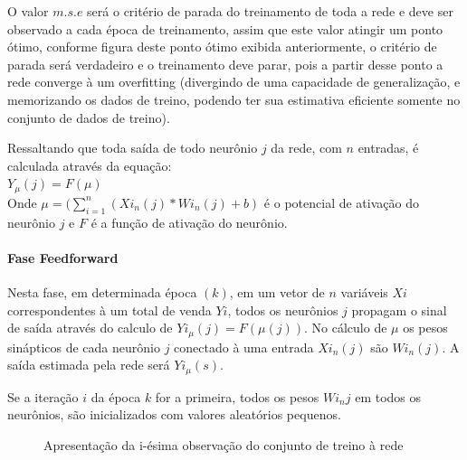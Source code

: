 \documentclass[	12pt, Times, openright, twoside, a4paper, english, brazil]{abntex2}
\begin{document}
            O valor $m.s.e$ será o critério de parada do treinamento de toda a rede e deve ser observado a cada época de treinamento, assim que este valor atingir um ponto ótimo, conforme figura deste ponto ótimo exibida anteriormente, o critério de parada será verdadeiro e o treinamento deve parar, pois a partir desse ponto a rede converge à um overfitting (divergindo de uma capacidade de generalização, e memorizando os dados de treino, podendo ter sua estimativa eficiente somente no conjunto de dados de treino).
            
            Ressaltando que toda saída de todo neurônio $j$ da rede, com $n$ entradas, é calculada através da equação:\\
            $ Y_{\mu}(j) = F(\mu)$\\
            Onde $\mu = (\sum_{i=1}^{n} (Xi_{n}(j)*Wi_{n}(j) + b)$ é o potencial de ativação do neurônio $j$ e $F$ é a função de ativação do neurônio.
            
           \paragraph*{Fase Feedforward}
            Nesta fase, em determinada época $(k)$, em um vetor de $n$ variáveis $Xi$ correspondentes à um total de venda $Yi$, todos os neurônios $j$ propagam o sinal de saída através do calculo de $Yi_{\mu}(j) = F(\mu(j))$. No cálculo de $\mu$ os pesos sinápticos de cada neurônio $j$ conectado à uma entrada $Xi_{n}(j)$ são $Wi_{n}(j)$. A saída estimada pela rede será $Yi_{\mu}(s)$.
            
            Se a iteração $i$ da época $k$ for a primeira, todos os pesos $Wi_{n}j$ em todos os neurônios, são inicializados com valores aleatórios pequenos.
            
            \begin{figure}[!ht]
          	\caption{Apresentação da i-ésima observação do conjunto de treino à rede}
           \end{figure}
           
\end{document}
